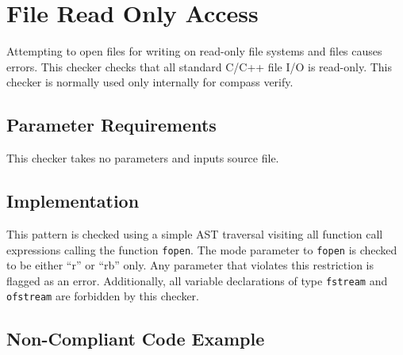 
\section{File Read Only Access}
\label{FileReadOnlyAccess::overview}
Attempting to open files for writing on read-only file systems and files causes errors. This checker checks that all standard C/C++ file I/O is read-only. This checker is normally used only internally for compass verify.

\subsection{Parameter Requirements}
This checker takes no parameters and inputs source file.

\subsection{Implementation}
This pattern is checked using a simple AST traversal visiting all function call expressions calling the function {\tt fopen}. The mode parameter to {\tt fopen} is checked to be either ``r'' or ``rb'' only. Any parameter that violates this restriction is flagged as an error. Additionally, all variable declarations of type {\tt fstream} and {\tt ofstream} are forbidden by this checker.

\subsection{Non-Compliant Code Example}

